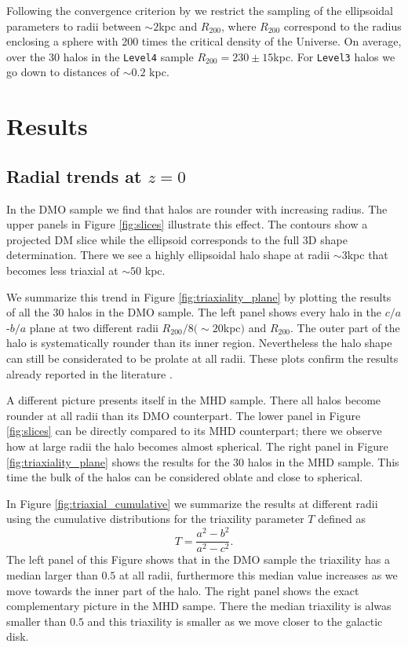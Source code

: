\documentclass[a4paper,fleqn,usenatbib]{mnras}
\begin{document}
Following the convergence criterion by \cite{Vera-Crito_et_al.2011} we
restrict the sampling of the ellipsoidal parameters to radii  between
$\sim 2$kpc and $R_{200}$, where  $R_{200}$ correspond to the  radius
enclosing a sphere with 200 times the critical density of the Universe.
On average, over the 30 halos in the \texttt{Level4} sample
$R_{200}=230\pm 15$kpc. 
For \texttt{Level3} halos we go down to distances of $\sim 0.2$ kpc.  

\section{Results}
\label{sec:results}

\subsection{Radial trends at $z=0$}

In the DMO sample we find that halos are rounder with increasing
radius.
The upper panels in Figure \ref{fig:slices} illustrate this effect.
The contours show a projected DM slice while the ellipsoid corresponds
to the full 3D shape determination. 
There we see a highly ellipsoidal halo shape at radii $\sim 3$kpc
that becomes less triaxial at $\sim 50$ kpc.

We summarize this trend in Figure \ref{fig:triaxiality_plane} by
plotting the results of all the 30 halos in the DMO sample.
The left panel shows every halo in the $c/a$-$b/a$ plane at
two different radii $R_{200}/8 (\sim 20$kpc$)$ and $R_{200}$. 
The outer part of the halo is systematically rounder than its inner
region. 
Nevertheless the halo shape can still be considerated to be prolate at
all radii. 
These plots confirm the results already reported in the
literature \citep{VeraCiro11}.

A different picture presents itself in the MHD sample.
There all halos become rounder at all radii than its DMO
counterpart.
The lower panel in Figure \ref{fig:slices} can be directly compared to
its MHD counterpart; there we observe how at large radii the halo
becomes almost spherical. 
The right panel in Figure \ref{fig:triaxiality_plane} shows the
results for the 30 halos in the MHD sample.
This time the bulk of the halos can be considered oblate and close to
spherical. 

In Figure \ref{fig:triaxial_cumulative} we summarize the results at
different radii using the cumulative distributions for the 
triaxility parameter $T$ defined as 
\begin{equation}
T=\frac{a^2-b^2}{a^2-c^2}.
\label{eq:triaxiality}
\end{equation}
The left panel of this Figure shows that in the DMO sample the
triaxility has a median larger than $0.5$ at all radii, furthermore
this median value increases as we move towards the inner part of the
halo.
The right panel shows the exact complementary picture in the MHD
sampe.
There the median triaxility is alwas smaller than $0.5$ and this
triaxility is smaller as we move closer to the galactic disk.
\end{document}
